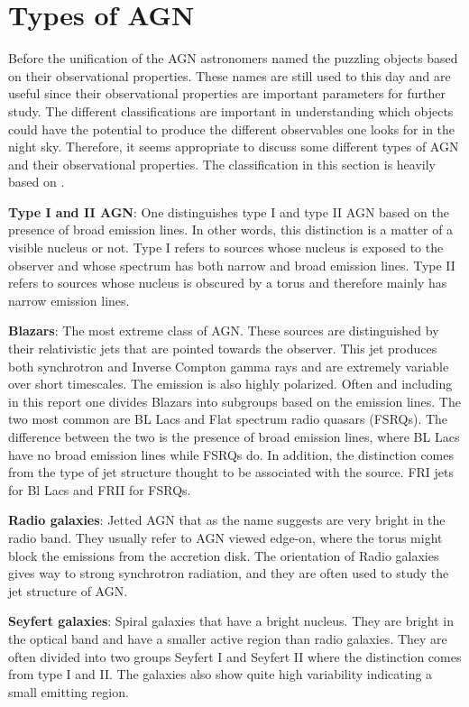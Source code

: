 \section{Types of AGN}

Before the unification of the AGN astronomers named the puzzling objects based on their observational properties. These 
names are still used to this day and are useful since their observational properties are important parameters for further study. 
The different classifications are important in understanding which objects could have the potential to produce the different observables one 
looks for in the night sky. Therefore, it seems appropriate to
discuss some different types of AGN and their observational properties. The classification in this section is heavily based on \cite{Astrobites}.

\textbf{Type I and II AGN}:
One distinguishes type I and type II AGN based on the presence of broad emission lines. In other words, this distinction is
a matter of a visible nucleus or not. Type I refers to sources whose nucleus is exposed to the observer and whose spectrum
has both narrow and broad emission lines. Type II refers to sources whose nucleus is obscured by a torus and therefore mainly has narrow emission lines.

\textbf{Blazars}:
The most extreme class of AGN. These sources are distinguished by their relativistic jets that are pointed towards the observer. 
This jet produces both synchrotron and Inverse Compton gamma rays and are extremely variable over short timescales. The
emission is also highly polarized. Often and including in this report one divides Blazars into subgroups based on the 
emission lines. The two most common are BL Lacs and Flat spectrum radio quasars (FSRQs). The difference between the two is the
presence of broad emission lines, where BL Lacs have no broad emission lines while FSRQs do. 
In addition, the distinction comes from the type of jet structure thought to be associated with the source. FRI jets for Bl Lacs and FRII for FSRQs. 

\textbf{Radio galaxies}:
Jetted AGN that as the name suggests are very bright in the radio band. They usually refer to AGN viewed edge-on, where the
torus might block the emissions from the accretion disk. The orientation of Radio galaxies gives way to strong 
synchrotron radiation, and they are often used to study the jet structure of AGN. 

\textbf{Seyfert galaxies}:
Spiral galaxies that have a bright nucleus. They are bright in the optical band and have a smaller active region 
than radio galaxies. They are often divided into two groups Seyfert I and Seyfert II where the distinction comes from type I and II. 
The galaxies also show quite high variability indicating a small emitting region. 

